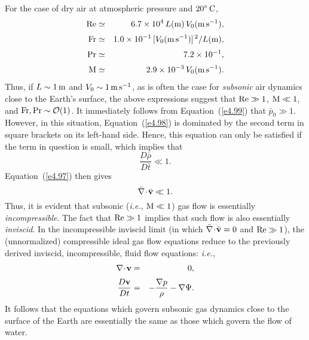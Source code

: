 For the case of dry air at atmospheric pressure and $20^\circ\,{\rm C}$, 
\begin{eqnarray}\label{e4.112}
{\rm Re} &\simeq& 6.7\times 10^4\,L({\rm m})\,V_0({\rm m\,s^{-1}}),\\[0.5ex]
{\rm Fr} &\simeq& 1.0\times 10^{-1}\,[V_0({\rm m\,s^{-1}})]^{\,2}/L({\rm m}),\\[0.5ex]
{\rm Pr} &\simeq & 7.2\times 10^{-1},\\[0.5ex]
{\rm M} &\simeq &2.9\times 10^{-3}\,V_0({\rm m\,s^{-1}}).\label{e4.115}
\end{eqnarray}
Thus, if $L\sim 1\,{\rm m}$ and $V_0\sim 1\,{\rm m\,s^{-1}}$, as is often the case for {\em subsonic}\/
air dynamics close to the Earth's surface, the above expressions suggest that ${\rm Re}\gg 1$,  ${\rm M}\ll 1$, and
${\rm Fr}, {\rm Pr} \sim {\cal O}(1)$. It immediately follows from Equation~(\ref{e4.99}) that $\bar{p}_0\gg 1$. 
However, in this situation, Equation~(\ref{e4.98}) is dominated by the second term in square brackets on
its left-hand side. Hence, this equation can only be satisfied if the term in question is small, which implies  that
\begin{equation}
\frac{D\bar{\rho}}{D\bar{t}} \ll 1.
\end{equation}
Equation~(\ref{e4.97}) then gives
\begin{equation}
\bar{\nabla}\!\cdot\!\bar{\bf v} \ll 1.
\end{equation}
Thus, it is evident that subsonic ({\em i.e.}, ${\rm M}\ll 1$) gas flow is essentially {\em incompressible}.
The fact that ${\rm Re}\gg 1$ implies that such flow is also essentially {\em inviscid}. In the
incompressible inviscid limit (in which $\bar{\nabla}\!\cdot\!\bar{\bf v}=0$ and ${\rm Re}\gg 1$),  the
(unnormalized) compressible ideal gas flow equations
reduce to the previously derived  inviscid, incompressible, fluid flow equations: {\em i.e.}, 
\begin{eqnarray}
\nabla\!\cdot\!{\bf v} &=& 0,\\[0.5ex]
\frac{D{\bf v}}{Dt}&=& - \frac{\nabla p}{\rho} - \nabla\Psi.
\end{eqnarray}
It follows that the equations which govern subsonic gas dynamics close to the surface of the Earth are essentially the
same as those which govern the  flow of water.

